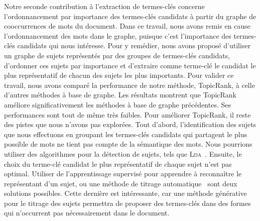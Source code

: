  Notre seconde contribution à l'extraction de termes-clés concerne
  l'ordonnancement par importance des termes-clés candidats à partir du graphe
  de cooccurrences de mots du document. Dans ce travail, nous avons remis en
  cause l'ordonnancement des mots dans le graphe, puisque c'est l'importance des
  termes-clés candidats qui nous intéresse. Pour y remédier, nous avons proposé
  d'utiliser un graphe de sujets représentés par des groupes de termes-clés
  candidats, d'ordonner ces sujets par importance et d'extraire comme terme-clé
  le candidat le plus représentatif de chacun des sujets les plus importants.
  Pour valider ce travail, nous avons comparé la performance de notre méthode,
  TopicRank, à celle d'autres méthodes à base de graphe. Les résultats montrent
  que TopicRank améliore significativement les méthodes à base de graphe
  précédentes. Ses performances sont tout de même très faibles. Pour
  améliorer TopicRank, il reste des pistes que nous n'avons pas explorées. Tout
  d'abord, l'identification des sujets que nous effectuons en groupant les
  termes-clés candidats qui partagent le plus possible de mots ne tient pas
  compte de la sémantique des mots. Nous pourrions utiliser des algorithmes pour
  la détection de sujets, tels que \textsc{Lda}~\cite{blei2003lda}. Ensuite, le
  choix du terme-clé candidat le plus représentatif de chaque sujet n'est pas
  optimal. Utiliser de l'apprentissage supervisé pour apprendre à reconnaître le
  représentant d'un sujet, ou une méthode de titrage
  automatique~\cite{lau2011topiclabeling} sont deux solutions possibles. Cette
  dernière est intéressante, car une méthode générative pour le titrage des
  sujets permettra de proposer des termes-clés dans des formes qui n'occurrent
  pas nécessairement dans le document.

